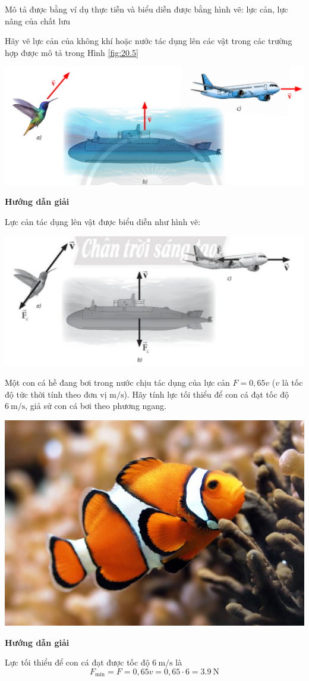 \begin{dang}{ Mô tả được bằng ví dụ thực tiễn và biểu diễn được bằng hình vẽ: lực cản, lực nâng của chất lưu}
	{Hãy vẽ lực cản của không khí hoặc nước tác dụng lên các vật trong các trường hợp được mô tả trong Hình \ref{fig:20.5}
		\begin{center}
			\includegraphics[width=0.6\linewidth]{../figs/VN10-2023-PH-TP020-5}
			\label{fig:20.5}
		\end{center}
}
{\begin{center}
		\textbf{Hướng dẫn giải}
	\end{center}
Lực cản tác dụng lên vật được biểu diễn như hình vẽ:
\begin{center}
	\includegraphics[width=0.6\linewidth]{../figs/VN10-2023-PH-TP020-6}
\end{center}
}
{Một con cá hề đang bơi trong nước chịu tác dụng của lực cản $F=0,65v$ ($v$ là tốc độ tức thời tính theo đơn vị $\si{\meter/\second}$). Hãy tính lực tối thiểu để con cá đạt tốc độ $\SI{6}{\meter/\second}$, giả sử con cá bơi theo phương ngang.
	\begin{center}
		\includegraphics[width=0.2\linewidth]{../figs/VN10-2023-PH-TP020-7}
	\end{center}
}
{\begin{center}
		\textbf{Hướng dẫn giải}
	\end{center}
Lực tối thiểu để con cá đạt được tốc độ $\SI{6}{\meter/\second}$ là 
$$F_\text{min}=F=0,65v=0,65\cdot6=\SI{3.9}{\newton}$$
}
\end{dang}
